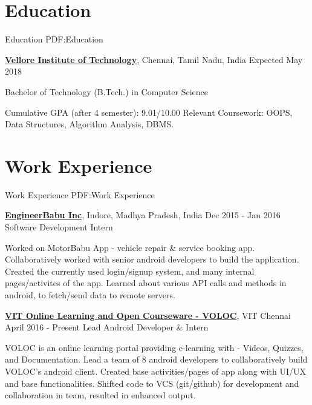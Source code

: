 \documentclass[letterpaper,10pt,oneside]{article}
\begin{document}
\begin{body}


\section
{Education}
{Education}
{PDF:Education}

\href{http://vit.ac.in/}
{\textbf{Vellore Institute of Technology}},
Chennai, Tamil Nadu, India
\hfill
{Expected May 2018}

\GapNoBreak
\BulletItem
Bachelor of Technology (B.Tech.) in Computer Science
\begin{detail}
\SubBulletItem
Cumulative GPA (after 4 semester): 9.01/10.00
\SubBulletItem
Relevant Coursework: OOPS, Data Structures, Algorithm Analysis, DBMS.
\end{detail}



\section
{Work Experience}
{Work Experience}
{PDF:Work Experience}

\href{https://www.engineerbabu.com/}
{\textbf{EngineerBabu Inc}},
Indore, Madhya Pradesh, India
\hfill
{Dec 2015 - Jan 2016}
\GapNoBreak
\BulletItem
Software Development Intern
\begin{detail}
\SubBulletItem
Worked on MotorBabu App - vehicle repair \& service booking app. 
\SubBulletItem
Collaboratively worked with senior android developers to build the application.
\SubBulletItem
Created the currently used login/signup system, and many internal pages/activites of the app.
\SubBulletItem
Learned about various API calls and methods in android, to fetch/send data to remote servers.
\end{detail}

\href{https://www.engineerbabu.com/}
{\textbf{VIT Online Learning and Open Courseware - VOLOC}}, VIT Chennai
\hfill
{April 2016 - Present}
\GapNoBreak
\BulletItem
Lead Android Developer \& Intern
\begin{detail}
\SubBulletItem
VOLOC is an online learning portal providing e-learning with - Videos, Quizzes, and Documentation.
\SubBulletItem
Lead a team of 8 android developers to collaboratively build VOLOC's android client.
\SubBulletItem
Created base activities/pages of app along with UI/UX and base functionalities.
\SubBulletItem
Shifted code to VCS (git/github) for development and collaboration in team, resulted in enhanced output.  
\end{detail}



\end{body}
\end{document}
